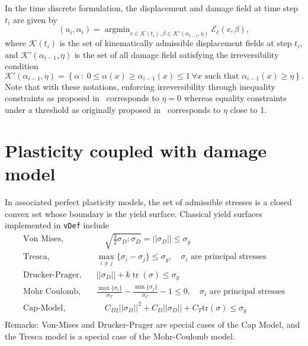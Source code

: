 \documentclass[10pt,oneside]{report}
\def\vDef{{\texttt{vDef}} }
\DeclareMathOperator*{\argmin}{argmin}
\DeclareMathOperator{\tr}{tr}
\begin{document}
In the time discrete formulation, the displacement and damage field at time step $t_i$ are given by
\begin{equation}
	\label{eq:globMin}
	(u_i,\alpha_i) = \argmin_{v \in \mathcal{K}(t_i), \beta \in \mathcal{K}'(\alpha_{i-1},\eta)} \mathcal{E}_\ell(v,\beta),
\end{equation}
where $\mathcal{K}(t_i)$ is the set of kinematically admissible displacement fields at step $t_i$, and $\mathcal{K}'(\alpha_{i-1},\eta)$ is the set of all damage field satisfying the irreversibility condition
$$
	\mathcal{K}'(\alpha_{i-1},\eta) = \left\{\alpha \ :\  0 \le \alpha(x) \ge \alpha_{i-1}(x) \le 1 \ \forall x \text{ such that } \alpha_{i-1}(x) \ge \eta\right\}.
$$
Note that with these notations, enforcing irreversibility through inequality constraints as proposed in~\cite{Giacomini-2005,Amor-Marigo-EtAl-2008a,Pham-Amor-EtAl-2011a} corresponds to $\eta = 0$ whereas equality constraints under a threshold as originally proposed in~\cite{Bourdin-Francfort-EtAl-2000a} corresponds to $\eta$ close to 1.

\section{Plasticity coupled with damage model}
\label{sec:plasticity}
In associated perfect plasticity models, the set of admissible stresses is a closed convex set whose boundary is the yield surface. 
Classical yield surfaces implemented in \vDef include
\begin{equation}
\begin{split}
\text{Von Mises},\quad& \quad \sqrt{\frac{3}{2}\sigma_D:\sigma_D} = ||\sigma_D|| \leq \sigma_y  \\
\text{Tresca},\quad& \max_{i\neq j} \{ \sigma_i - \sigma_j \} \leq \sigma _y ,\quad  \sigma_i \text{ are principal stresses}   \\
\text{Drucker-Prager},\quad& ||\sigma_D || + k \tr(\sigma) \leq \sigma_y \\
\text{Mohr Coulomb},\quad& \frac{\max\{\sigma_i\}}{\sigma_T} - \frac{\min\{\sigma_j\}}{\sigma_C} -1 \leq 0 ,\quad  \sigma_i \text{ are principal stresses}  \\
\text{Cap-Model},\quad& \quad C_{D2} ||\sigma_D||^2 + C_D||\sigma_D|| + C_T \text{tr} (\sigma) \leq \sigma_y \\
\end{split}
\end{equation}
Remarks: Von-Mises and Drucker-Prager are special cases of the Cap Model, and the  Tresca model is a special case of the Mohr-Coulomb model.
\end{document}
